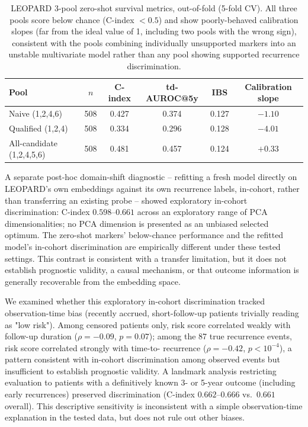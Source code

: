 \begin{table}[htbp]
\centering
\small
\begin{tabular}{lccccc}
\toprule
Pool & $n$ & C-index & td-AUROC@5y & IBS & Calibration slope \\
\midrule
Naive (1,2,4,6) & 508 & 0.427 & 0.374 & 0.127 & $-1.10$ \\
Qualified (1,2,4) & 508 & 0.334 & 0.296 & 0.128 & $-4.01$ \\
All-candidate (1,2,4,5,6) & 508 & 0.481 & 0.457 & 0.124 & $+0.33$ \\
\bottomrule
\end{tabular}
\caption{LEOPARD 3-pool zero-shot survival metrics, out-of-fold (5-fold CV). All three pools
score below chance (C-index $<0.5$) and show poorly-behaved calibration slopes (far from the
ideal value of 1, including two pools with the wrong sign), consistent with the pools combining
individually unsupported markers into an unstable multivariate model rather than any pool
showing supported recurrence discrimination.}
\label{tab:leopard-survival}
\end{table}

A separate post-hoc domain-shift diagnostic -- refitting a fresh model directly on LEOPARD's own
embeddings against its own recurrence labels, in-cohort, rather than transferring an existing
probe -- showed exploratory in-cohort discrimination: C-index $0.598$--$0.661$ across an
exploratory range of PCA dimensionalities; no PCA dimension is presented as an unbiased
selected optimum. The zero-shot markers' below-chance performance and the refitted model's
in-cohort discrimination are empirically different under these tested settings. This contrast
is consistent with a transfer limitation, but it does not establish prognostic validity, a
causal mechanism, or that outcome information is generally recoverable from the embedding
space.

We examined whether this exploratory in-cohort discrimination tracked observation-time
bias (recently accrued, short-follow-up patients trivially reading as "low risk"). Among
censored patients only, risk score correlated weakly with follow-up duration ($\rho=-0.09$,
$p=0.07$); among the 87 true recurrence events, risk score correlated strongly with time-to-
recurrence ($\rho=-0.42$, $p<10^{-4}$), a pattern consistent with in-cohort discrimination
among observed events but insufficient to establish prognostic validity. A
landmark analysis restricting evaluation to patients with a definitively known 3- or 5-year
outcome (including early recurrences) preserved discrimination (C-index $0.662$--$0.666$
vs.\ $0.661$ overall). This descriptive sensitivity is inconsistent with a simple
observation-time explanation in the tested data, but does not rule out other biases.

